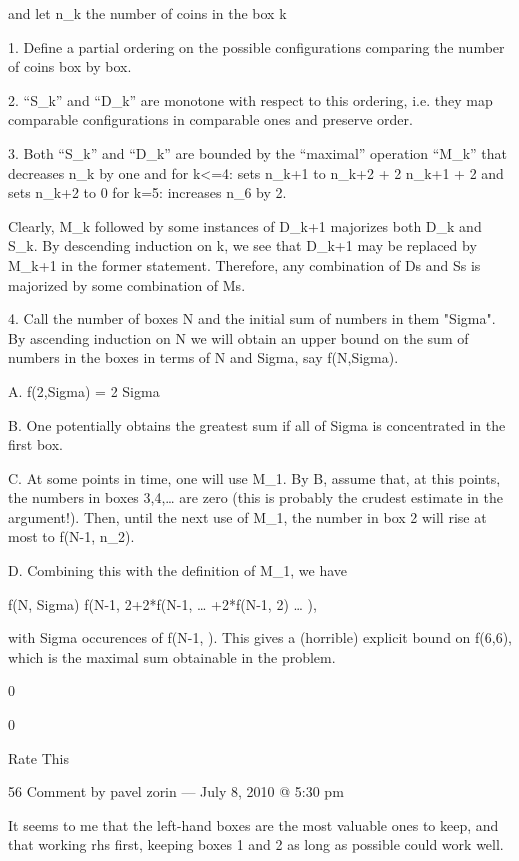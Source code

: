     and let n_k the number of coins in the box k

    1. Define a partial ordering on the possible configurations comparing the number of coins box by box.

    2. “S_k” and “D_k” are monotone with respect to this ordering, i.e. they map comparable configurations in comparable ones and preserve order.

    3. Both “S_k” and “D_k” are bounded by the “maximal” operation “M_k” that decreases n_k by one and
    for k<=4: sets n_{k+1} to n_{k+2} + 2 n_{k+1} + 2 and sets n_{k+2} to 0
    for k=5: increases n_6 by 2.

    Clearly, M_k followed by some instances of D_{k+1} majorizes both D_k and S_k. By descending induction on k, we see that D_{k+1} may be replaced by M_{k+1} in the former statement. Therefore, any combination of Ds and Ss is majorized by some combination of Ms.

    4. Call the number of boxes N and the initial sum of numbers in them "Sigma". By ascending induction on N we will obtain an upper bound on the sum of numbers in the boxes in terms of N and Sigma, say f(N,Sigma).

    A. f(2,Sigma) = 2 Sigma

    B. One potentially obtains the greatest sum if all of Sigma is concentrated in the first box.

    C. At some points in time, one will use M_1. By B, assume that, at this points, the numbers in boxes 3,4,… are zero (this is probably the crudest estimate in the argument!). Then, until the next use of M_1, the number in box 2 will rise at most to f(N-1, n_2).

    D. Combining this with the definition of M_1, we have

    f(N, Sigma) \leq f(N-1, 2+2*f(N-1, … +2*f(N-1, 2) … ),

    with Sigma occurences of f(N-1, \cdot ). This gives a (horrible) explicit bound on f(6,6), which is the maximal sum obtainable in the problem.
     
    0
     
    0
     
    Rate This

    56 Comment by pavel zorin — July 8, 2010 @ 5:30 pm

    It seems to me that the left-hand boxes are the most valuable ones to keep, and that working rhs first, keeping boxes 1 and 2 as long as possible could work well.
     
